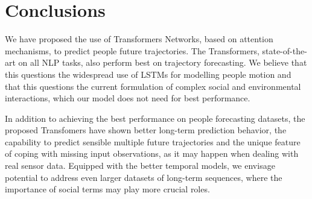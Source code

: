 \documentclass[a4paper,conference]{IEEEtran}
\begin{document}
\iffalse
 \begin{figure*}[]
	\begin{center}
	    \texttt{[image: ./Figures/traj-s1.pdf]}
\end{center}
\caption{Trajnet sample. Fabio please chck}\label{fig:prop-appro}
\end{figure*}


\begin{figure*}[h]
    \centering
    \texttt{[image: ./Figures/zara1\_56\_zoom\_2.png]}
\caption{Example of five sampled prediction extracted using our Quantized-TF}
    \label{fig:Qual_zara1_56}
\end{figure*}{}

\begin{figure*}[h]
    \centering
    \texttt{[image: ./Figures/zara1\_56\_zoom\_2.png]}
    \texttt{[image: ./Figures/zara1\_56\_zoom\_3.png]}
    \texttt{[image: ./Figures/zara1\_56\_zoom\_3.png]}
\caption{Example of five sampled prediction extracted using our Quantized-TF}
    \label{fig:Qual_zara1_56}
\end{figure*}{}
\fi










 \section{Conclusions}
We have proposed the use of Transformers Networks, based on attention mechanisms, to predict people future trajectories. The Transformers, state-of-the-art on all NLP tasks, also perform best on trajectory forecasting. We believe that this questions the widespread use of LSTMs for modelling people motion and that this questions the current formulation of complex social and environmental interactions, which our model does not need for best performance.

In addition to achieving the best performance on people forecasting datasets, the proposed Transfomers have shown better long-term prediction behavior, the capability to predict sensible multiple future trajectories and the unique feature of coping with missing input observations, as it may happen when dealing with real sensor data. Equipped with the better temporal models, we envisage potential to address even larger datasets of long-term sequences, where the importance of social terms may play more crucial roles.
\end{document}

